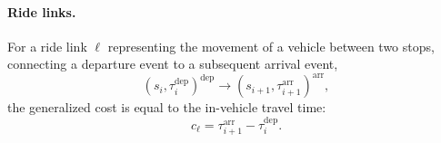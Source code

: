 \paragraph{Ride links.}
For a ride link $\ell$ representing the movement of a vehicle between two
stops, connecting a departure event to a subsequent arrival event,
\[
(s_i,\tau_i^{\mathrm{dep}})^{\mathrm{dep}} \rightarrow (s_{i+1},\tau_{i+1}^{\mathrm{arr}})^{\mathrm{arr}},
\]
the generalized cost is equal to the in-vehicle travel time:
\[
c_\ell = \tau_{i+1}^{\mathrm{arr}} - \tau_i^{\mathrm{dep}} .
\]

